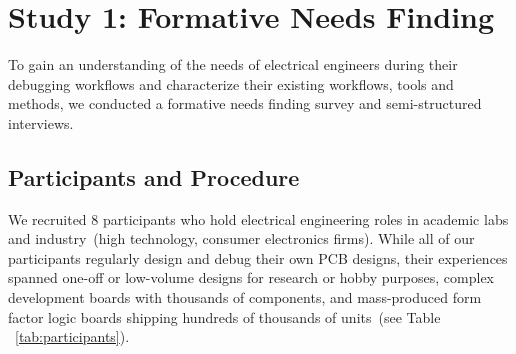 \documentclass [11pt, proquest] {uwthesis}[2020/02/24]
\begin{document}
\newcommand{\quotelabel}{Q\arabic{quoteCounter}\stepcounter{quoteCounter}}

\section{Study 1: Formative Needs Finding}
\label{sec:prestudy}

To gain an understanding of the needs of electrical engineers during their debugging workflows and characterize their existing workflows, tools and methods, we conducted a formative needs finding survey and semi-structured interviews.

\subsection{Participants and Procedure}
We recruited 8 participants who hold electrical engineering roles in academic labs and industry~(high technology, consumer electronics firms). While all of our participants regularly design and debug their own PCB designs, their experiences spanned one-off or low-volume designs for research or hobby purposes,  complex development boards with thousands of components, and mass-produced form factor logic boards shipping hundreds of thousands of units~(see Table ~\ref{tab:participants}).
\end{document}

